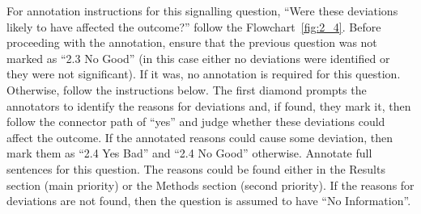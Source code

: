 \documentclass[sn-mathphys,Numbered]{sn-jnl}%
\begin{document}
For annotation instructions for this signalling question, ``Were these deviations likely to have affected the outcome?'' follow the Flowchart~\ref{fig:2_4}.
Before proceeding with the annotation, ensure that the previous question was not marked as ``2.3 No Good'' (in this case either no deviations were identified or they were not significant).
If it was, no annotation is required for this question.
Otherwise, follow the instructions below.
The first diamond prompts the annotators to identify the reasons for deviations and, if found, they mark it, then follow the connector path of ``yes'' and judge whether these deviations could affect the outcome.
If the annotated reasons could cause some deviation, then mark them as ``2.4 Yes Bad'' and ``2.4 No Good'' otherwise.
Annotate full sentences for this question.
The reasons could be found either in the Results section (main priority) or the Methods section (second priority).
If the reasons for deviations are not found, then the question is assumed to have ``No Information''.
%
%
%
\end{document}
